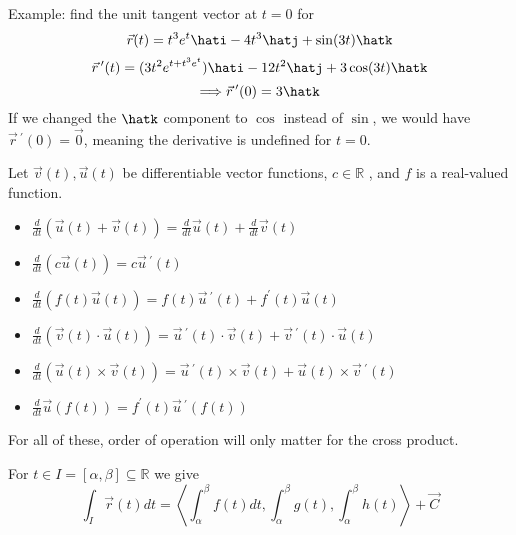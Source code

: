 Example: find the unit tangent vector at \(t=0\) for
\[
    \vec{r}(t)=t^3 e^t\hati-4t^3\hatj+\sin (3t)\hatk
\]
\[
    \vec{r}\,^{\prime} (t)=(3t^2 e^{t+t^3 e^t} )\hati-12t^2 \hatj+3\cos (3t)\hatk
\]
\[
    \Longrightarrow \vec{r}\,^{\prime} (0)=3\hatk
\]
If we changed the \(\hatk\) component to \(\cos \) instead of \(\sin \), we would have \(\vec{r}\,^{\prime} (0)=\vec{0}\), meaning the derivative is undefined for \(t=0\).\\
\begin{definition}
    Let \(\vec{v}(t),\vec{u}(t)\) be differentiable vector functions, \(c\in\mathbb{R} \) , and \(f\) is a real-valued function.
    \begin{itemize}
        \item \(\frac{d}{dt}(\vec{u}(t)+\vec{v}(t))=\frac{d}{dt}\vec{u}(t)+\frac{d}{dt}\vec{v}(t)\) 
        \item \(\frac{d}{dt}(c\vec{u}(t))=c\vec{u}\,^{\prime} (t)\)
        \item \(\frac{d}{dt}(f(t)\vec{u}(t))=f(t)\vec{u}\,^{\prime} (t)+f^{\prime} (t)\vec{u}(t)\) 
        \item \(\frac{d}{dt}(\vec{v}(t)\cdot\vec{u}(t))=\vec{u}\,^{\prime} (t)\cdot\vec{v}(t)+\vec{v}\,^{\prime} (t)\cdot\vec{u}(t)\) 
        \item \(\frac{d}{dt}(\vec{u}(t)\times \vec{v}(t))=\vec{u}\,^{\prime} (t)\times \vec{v}(t)+\vec{u}(t)\times \vec{v}\,^{\prime} (t)\) 
        \item \(\frac{d}{dt}\vec{u}(f(t))=f^{\prime} (t)\vec{u}\,^{\prime} (f(t))\)
    \end{itemize}
    For all of these, order of operation will only matter for the cross product.
\end{definition}
\begin{definition}
    For \(t\in I=[\alpha,\beta] \subseteq\mathbb{R} \) we give
    \[
        \int_I \vec{r}(t)dt=\left\langle \int_\alpha^\beta f(t)dt,\int_\alpha^\beta g(t),\int_\alpha^\beta h(t) \right\rangle +\vec{C}
    \]
\end{definition}
